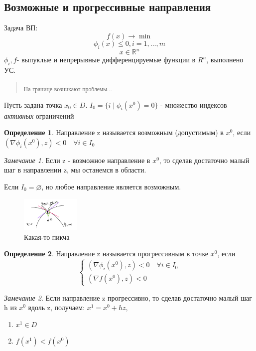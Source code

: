 \documentclass[a4paper]{article}
\theoremstyle{definition}
\newtheorem*{definition}{Определение}
\theoremstyle{remark}
\newtheorem*{remark}{Замечание}
\begin{document}
\subsection{Возможные и прогрессивные направления}
Задача ВП:
\begin{equation}
    f(x) \to \min
\end{equation}
\begin{equation}
    \phi_i(x) \le 0, i = 1, \dots, m
\end{equation}
\begin{equation}
    x \in \mathbb{R}^n
\end{equation}
$\phi_i, f$- выпуклые и непрерывные дифференцируемые функции в $R^n$, выполнено УС.
\begin{quotation}
    \textsubscript{На границе возникают проблемы...}
\end{quotation}
Пусть задана точка $x_0\in D$.
$I_0 = \{i \; | \; \phi_i(x^0) = 0\}$ - множество индексов \textit{активных} ограничений
\begin{definition}
    Направление z называется возможным (допустимым) в $x^0$, если $(\nabla \phi_i(x^0), z)<0 \quad \forall i \in I_0$ 
\end{definition}
\begin{remark}
    Если z - возможное направление в $x^0$, то сделав достаточно малый шаг в направлении z, мы останемся в области.

    Если $I_0 = \varnothing$, но любое направление является возможным.
\end{remark}

\begin{figure}
    \includegraphics[width=0.25\textwidth]{2023-05-08 153256.png}
    \caption{Какая-то пикча}
    \label{fig:pic}
\end{figure}
\begin{definition}
    Направление z называется прогрессивным в точке $x^0$, если
    \[\begin{cases}
        (\nabla \phi_i(x^0), z)<0 \quad \forall i \in I_0 \\
        (\nabla f(x^0), z)<0 
    \end{cases}\]
\end{definition}
\begin{remark}
    Если направление z прогрессивно, то сделав достаточно малый шаг h из $x^0$ вдоль z, получаем:
    $x^1 = x^0 + hz$, 
    \begin{enumerate}
        \item $x^1 \in D$
        \item $f(x^1) < f(x^0)$
    \end{enumerate}
\end{remark}
\end{document}
